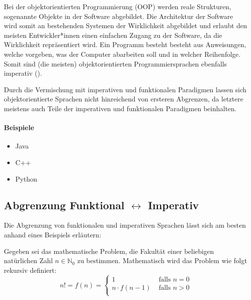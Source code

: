     Bei der objektorientierten Programmierung (OOP) werden reale Strukturen, sogenannte Objekte in der Software abgebildet. Die Architektur der Software wird somit an bestehenden Systemen der Wirklichkeit abgebildet und erlaubt den meisten Entwickler*innen einen einfachen Zugang zu der Software, da die Wirklichkeit repräsentiert wird. Ein Programm besteht besteht aus Anweisungen, welche vorgeben, was der Computer abarbeiten soll und in welcher Reihenfolge. Somit sind (die meisten) objektorientierten Programmiersprachen ebenfalls imperativ ().
    
    Durch die Vermischung mit imperativen und funktionalen Paradigmen lassen sich objektorientierte Sprachen nicht hinreichend von ersteren Abgrenzen, da letztere meistens auch Teile der imperativen und funktionalen Paradigmen beinhalten.
    
    \paragraph{Beispiele}
        \begin{itemize}
            \item Java
            \item C++
            \item Python
        \end{itemize}

\subsection{Abgrenzung Funktional $ \leftrightarrow $ Imperativ}
    
    Die Abgrenzung von funktionalen und imperativen Sprachen lässt sich am besten anhand eines Beispiels erläutern:
    
    Gegeben sei das mathematische Problem, die Fakultät einer beliebigen natürlichen Zahl $ n \in \mathbb{N} _ 0 $ zu bestimmen. Mathematisch wird das Problem wie folgt rekursiv definiert:
    \begin{equation*}
        n! = f(n) = \begin{cases*}
            1 & \text{ falls } n = 0 \\
            n \cdot f(n - 1) & \text{ falls } n > 0 \\
        \end{cases*}
    \end{equation*}
    
